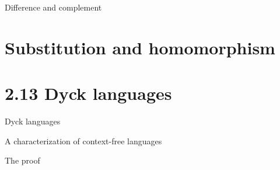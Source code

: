 \documentclass[handout]{beamer}
\begin{document}
\begin{frame}{Difference and complement}

    

\end{frame}


\section*{Substitution and homomorphism}



\section*{2.13 Dyck languages}


\begin{frame}{Dyck languages}

    
\end{frame}


\begin{frame}{A characterization of context-free languages}


\end{frame}


\begin{frame}{The proof}

    

\end{frame}
\end{document}
